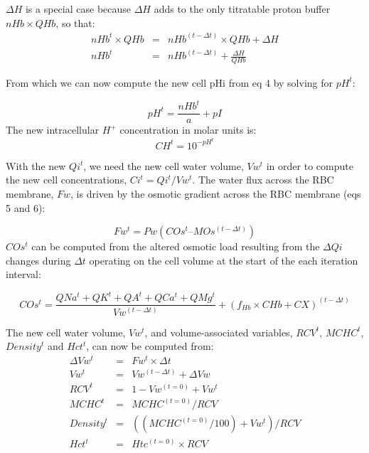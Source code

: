 \documentclass[a4paper]{article}
\newcommand{\med}[1]{M#1}
\newcommand{\cell}[1]{C#1}
\newcommand{\MOs}{\med{Os}}
\newcommand{\CHb}{\cell{Hb}}
\newcommand{\COs}{\cell{Os}}
\newcommand{\CX}{\cell{X}}
\begin{document}
$\Delta H$ is a special case because $\Delta H$ adds to the only titratable proton buffer $nHb\times QHb$, so that:
\setcounter{equation}{0}
\renewcommand{\theequation}{21\alph{equation}}
\begin{eqnarray}
nHb^t\times QHb &=& nHb^{(t-\Delta t)}\times QHb + \Delta H \\
nHb^t &=& nHb^{(t-\Delta t)}  + \frac{\Delta H}{QHb}
\end{eqnarray}

From which we can now compute the new cell pHi from eq 4 by solving for $pH^t$:

\begin{equation}
pH^t = \frac{nHb^t}{a} + pI
\end{equation}
The new intracellular $H^+$ concentration in molar units is:
\begin{equation}
CH^t = 10^{-pH^t}
\end{equation}

With the new $Qi^t$, we need the new cell water volume, $Vw^t$ in order to compute the new cell concentrations, $Ci^t = Qi^t/Vw^t$.  The water flux across the RBC membrane, $Fw$, is driven by the osmotic gradient across the RBC membrane (eqs 5 and 6): 
\setcounter{equation}{0}
\renewcommand{\theequation}{22\alph{equation}}

\begin{equation}
Fw^t = Pw(\COs^t – \MOs^{(t-\Delta t)}) 
\end{equation}
$\COs^t$ can be computed from the altered osmotic load resulting from the $\Delta Qi$ changes during $\Delta t$ operating on the cell volume at the start of the each iteration interval: 

\begin{equation}
COs^t = \frac{QNa^t + QK^t + QA^t + QCa^t + QMg^t}{Vw^{(t-\Delta t)}}  + (f_{Hb}\times\CHb + \CX )^{(t-\Delta t)}
\end{equation}


\setcounter{equation}{0}
\renewcommand{\theequation}{23\alph{equation}}

The new cell water volume, $Vw^t$, and volume-associated variables, $RCV^t$, $MCHC^t$, $Density^t$ and $Hct^t$, can now be computed from: 
\begin{eqnarray}
\Delta Vw^t &=& Fw^t\times\Delta t \\
Vw^t &=& Vw^{(t-\Delta t)} + \Delta Vw \\
RCV^t &=& 1-Vw^{(t=0)} + Vw^t  \\
MCHC^t &=& MCHC^{(t=0)}/RCV  \\
Density^t &=& ((MCHC^{(t=0)}/100) + Vw^t)/RCV  \\
Hct^t &=& Htc^{(t=0)}\times RCV  
\end{eqnarray}
\end{document}
